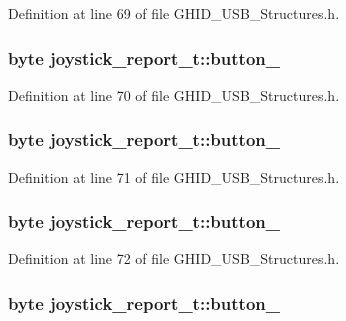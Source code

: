 \-Definition at line 69 of file \-G\-H\-I\-D\-\_\-\-U\-S\-B\-\_\-\-Structures.\-h.

\hypertarget{structjoystick__report__t_af142ca63810131e6386b3bde9de28864}{
\subsubsection[{button\-\_\-2}]{\setlength{\rightskip}{0pt plus 5cm}byte {\bf joystick\-\_\-report\-\_\-t\-::button\-\_}}}\label{structjoystick__report__t_af142ca63810131e6386b3bde9de28864}


\-Definition at line 70 of file \-G\-H\-I\-D\-\_\-\-U\-S\-B\-\_\-\-Structures.\-h.

\hypertarget{structjoystick__report__t_ae2f9a864f5f3f93f8a2975542b019c81}{
\subsubsection[{button\-\_\-3}]{\setlength{\rightskip}{0pt plus 5cm}byte {\bf joystick\-\_\-report\-\_\-t\-::button\-\_}}}\label{structjoystick__report__t_ae2f9a864f5f3f93f8a2975542b019c81}


\-Definition at line 71 of file \-G\-H\-I\-D\-\_\-\-U\-S\-B\-\_\-\-Structures.\-h.

\hypertarget{structjoystick__report__t_a6e6f89e0ae6bfa464e58e6cf13e58780}{
\subsubsection[{button\-\_\-4}]{\setlength{\rightskip}{0pt plus 5cm}byte {\bf joystick\-\_\-report\-\_\-t\-::button\-\_}}}\label{structjoystick__report__t_a6e6f89e0ae6bfa464e58e6cf13e58780}


\-Definition at line 72 of file \-G\-H\-I\-D\-\_\-\-U\-S\-B\-\_\-\-Structures.\-h.

\hypertarget{structjoystick__report__t_a40d6ab0397fbb594304c624a03da1eed}{
\subsubsection[{button\-\_\-5}]{\setlength{\rightskip}{0pt plus 5cm}byte {\bf joystick\-\_\-report\-\_\-t\-::button\-\_}}}\label{structjoystick__report__t_a40d6ab0397fbb594304c624a03da1eed}


